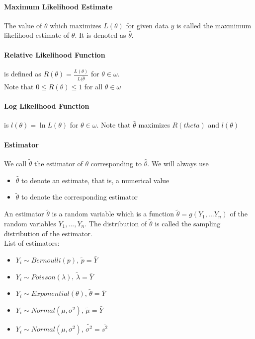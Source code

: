     \paragraph{Maximum Likelihood Estimate} The value of $\theta$ which
    maximizes $L(\theta)$ for given data $y$ is called the maxmimum likelihood
    estimate of $\theta$. It is denoted as $\hat{\theta}$.

    \paragraph{Relative Likelihood Function} is defined as $R(\theta) =
    \frac{L(\theta)}{L(\hat{\theta}}$ for $\theta \in \omega$.\\
    Note that $0 \leq R(\theta) \leq 1$ for all $\theta \in \omega$

    \paragraph{Log Likelihood Function} is $l(\theta) = \ln L(\theta)$ for
      $\theta \in \omega$. Note that $\hat{\theta}$ maximizes $R(theta)$ and
      $l(\theta)$

    \paragraph{Estimator} We call $\tilde{\theta}$ the estimator of $\theta$
    corresponding to $\hat{\theta}$. We will always use
    \begin{itemize}
      \item $\hat{\theta}$ to denote an estimate, that is, a numerical value
      \item $\tilde{\theta}$ to denote the corresponding estimator
    \end{itemize}
    An estimator $\tilde{\theta}$ is a random variable which is a function
    $\tilde{\theta} = g(Y_1, ... Y_n)$ of the random variables $Y_1, ... ,
    Y_n$. The distribution of $\tilde{\theta}$ is called the sampling
    distribution of the estimator.\\
    List of estimators:
    \begin{itemize}
      \item $Y_i \sim Bernoulli(p)$, $\tilde{p} = \bar{Y}$
      \item $Y_i \sim Poisson(\lambda)$, $\tilde{\lambda} = \bar{Y}$
      \item $Y_i \sim Exponential(\theta)$, $\tilde{\theta} = \bar{Y}$
      \item $Y_i \sim Normal(\mu, \sigma^2)$, $\tilde{\mu} = \bar{Y}$
      \item $Y_i \sim Normal(\mu, \sigma^2)$, $\tilde{\sigma^2} = \bar{s^2}$
    \end{itemize}

